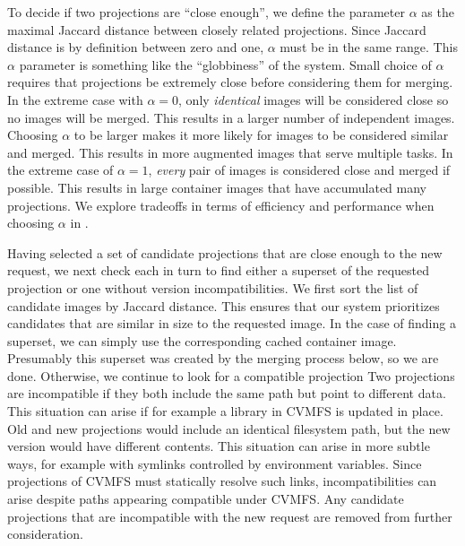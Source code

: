 \documentclass[sigconf]{acmart}
\begin{document}
To decide if two projections are ``close enough'',
we define the parameter $\alpha$ as the maximal Jaccard distance between closely related projections.
Since Jaccard distance is by definition between zero and one,
$\alpha$ must be in the same range.
This $\alpha$ parameter is something like the ``globbiness'' of the system.
Small choice of $\alpha$ requires that projections be extremely close before considering them for merging.
In the extreme case with $\alpha = 0$,
only \emph{identical} images will be considered close so no images will be merged.
This results in a larger number of independent images.
Choosing $\alpha$ to be larger makes it more likely for images to be considered similar and merged.
This results in more augmented images that serve multiple tasks.
In the extreme case of $\alpha = 1$,
\emph{every} pair of images is considered close and merged if possible.
This results in large container images that have accumulated many projections.
We explore tradeoffs in terms of efficiency and performance when choosing $\alpha$ in .

Having selected a set of candidate projections that are close enough to the new request,
we next check each in turn to find either a superset of the requested projection or one without version incompatibilities.
We first sort the list of candidate images by Jaccard distance.
This ensures that our system prioritizes candidates that are similar in size to the requested image.
In the case of finding a superset,
we can simply use the corresponding cached container image.
Presumably this superset was created by the merging process below,
so we are done.
Otherwise, we continue to look for a compatible projection
Two projections are incompatible if they both include the same path but point to different data.
This situation can arise if for example a library in CVMFS is updated in place.
Old and new projections would include an identical filesystem path,
but the new version would have different contents.
This situation can arise in more subtle ways,
for example with symlinks controlled by environment variables.
Since projections of CVMFS must statically resolve such links,
incompatibilities can arise despite paths appearing compatible under CVMFS.
Any candidate projections that are incompatible with the new request are removed from further consideration.
\end{document}
